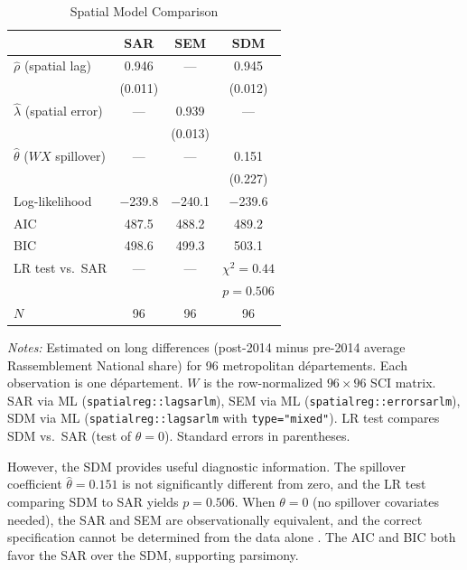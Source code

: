 \documentclass[12pt]{article}
\newcommand{\rn}{Rassemblement National}
\newcommand{\dept}{d\'{e}partement}
\newcommand{\depts}{d\'{e}partements}
\begin{document}
\begin{table}[H]
\centering
\caption{Spatial Model Comparison}
\label{tab:spatial}
\begin{threeparttable}
\begin{tabular}{@{}lccc@{}}
\toprule
 & SAR & SEM & SDM \\
\midrule
$\hat{\rho}$ (spatial lag) & 0.946 & --- & 0.945 \\
 & (0.011) & & (0.012) \\[2pt]
$\hat{\lambda}$ (spatial error) & --- & 0.939 & --- \\
 & & (0.013) & \\[2pt]
$\hat{\theta}$ ($WX$ spillover) & --- & --- & 0.151 \\
 & & & (0.227) \\[3pt]
Log-likelihood & $-$239.8 & $-$240.1 & $-$239.6 \\
AIC & 487.5 & 488.2 & 489.2 \\
BIC & 498.6 & 499.3 & 503.1 \\[3pt]
LR test vs.\ SAR & --- & --- & $\chi^2 = 0.44$ \\
 & & & $p = 0.506$ \\[3pt]
$N$ & 96 & 96 & 96 \\
\bottomrule
\end{tabular}
\begin{tablenotes}
\small
\item \textit{Notes:} Estimated on long differences (post-2014 minus pre-2014 average \rn{} share) for 96 metropolitan \depts{}. Each observation is one \dept{}. $W$ is the row-normalized $96 \times 96$ SCI matrix. SAR via ML (\texttt{spatialreg::lagsarlm}), SEM via ML (\texttt{spatialreg::errorsarlm}), SDM via ML (\texttt{spatialreg::lagsarlm} with \texttt{type="mixed"}). LR test compares SDM vs.\ SAR (test of $\theta = 0$). Standard errors in parentheses.
\end{tablenotes}
\end{threeparttable}
\end{table}

However, the SDM provides useful diagnostic information. The spillover coefficient $\hat{\theta} = 0.151$ is not significantly different from zero, and the LR test comparing SDM to SAR yields $p = 0.506$. When $\theta = 0$ (no spillover covariates needed), the SAR and SEM are observationally equivalent, and the correct specification cannot be determined from the data alone \citep{lesage2009introduction}. The AIC and BIC both favor the SAR over the SDM, supporting parsimony.
\end{document}
